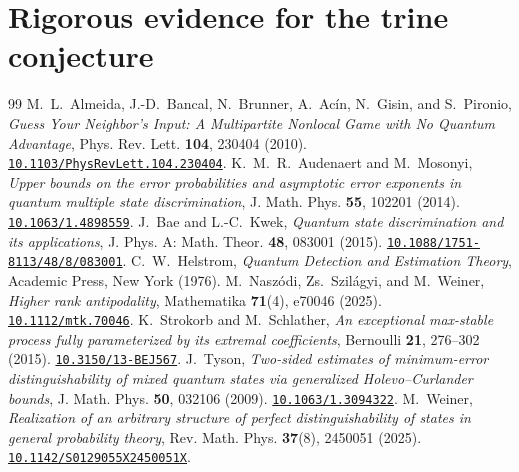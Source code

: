 \documentclass[10pt,a4paper]{amsart}
\newcommand{\1}{\mathbf 1}
\newcommand{\doi}[1]{\href{https://doi.org/#1}{\nolinkurl{#1}}}
\begin{document}
\appendix
\section{Rigorous evidence for the trine conjecture}\label{app:evidence}


\begin{thebibliography}{99}
 M.~L.~Almeida, J.-D.~Bancal, N.~Brunner, A.~Ac\'in, N.~Gisin, and S.~Pironio, \emph{Guess Your Neighbor's Input: A Multipartite Nonlocal Game with No Quantum Advantage}, Phys. Rev. Lett. \textbf{104}, 230404 (2010). \doi{10.1103/PhysRevLett.104.230404}.
 K.~M.~R.~Audenaert and M.~Mosonyi, \emph{Upper bounds on the error probabilities and asymptotic error exponents in quantum multiple state discrimination}, J. Math. Phys. \textbf{55}, 102201 (2014). \doi{10.1063/1.4898559}.
 J.~Bae and L.-C.~Kwek, \emph{Quantum state discrimination and its applications}, J. Phys. A: Math. Theor. \textbf{48}, 083001 (2015). \doi{10.1088/1751-8113/48/8/083001}.
 C.~W.~Helstrom, \emph{Quantum Detection and Estimation Theory}, Academic Press, New York (1976).
 M.~Nasz\'odi, Zs.~Szil\'agyi, and M.~Weiner, \emph{Higher rank antipodality}, Mathematika \textbf{71}(4), e70046 (2025). \doi{10.1112/mtk.70046}.
 K.~Strokorb and M.~Schlather, \emph{An exceptional max-stable process fully parameterized by its extremal coefficients}, Bernoulli \textbf{21}, 276--302 (2015). \doi{10.3150/13-BEJ567}.
 J.~Tyson, \emph{Two-sided estimates of minimum-error distinguishability of mixed quantum states via generalized Holevo--Curlander bounds}, J. Math. Phys. \textbf{50}, 032106 (2009). \doi{10.1063/1.3094322}.
 M.~Weiner, \emph{Realization of an arbitrary structure of perfect distinguishability of states in general probability theory}, Rev. Math. Phys. \textbf{37}(8), 2450051 (2025). \doi{10.1142/S0129055X2450051X}.
\end{thebibliography}
\end{document}
